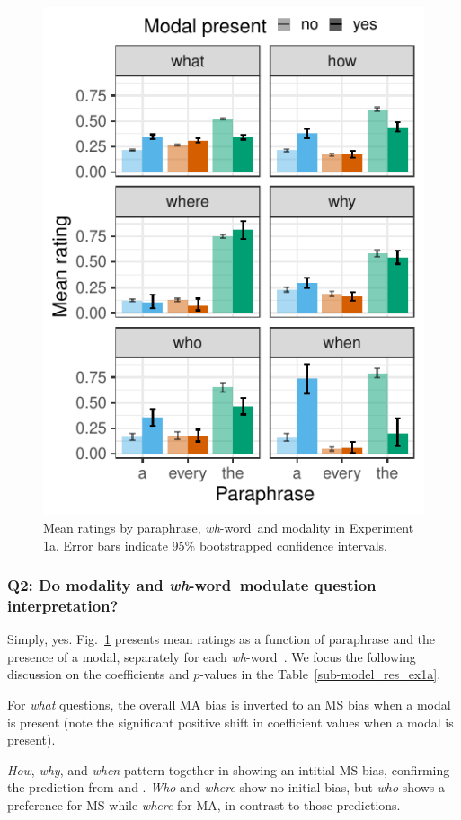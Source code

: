 \documentclass[12pt,letterpaper,table,svgnames,dvipsnames]{article}
\newcommand{\tableref}[1]{Table~\ref{#1}}
\newcommand{\figref}[1]{Fig.~\ref{#1}}
\newcommand{\whw}{\emph{wh}-word~}
\begin{document}
\begin{figure}[h!]
\centering
\includegraphics[scale=1]{figures/modxwh_rq_context.pdf}
\caption{Mean ratings by paraphrase, \whw and modality in Experiment 1a. Error bars indicate 95\% bootstrapped confidence intervals.} 
\label{ex1a_modXwh}
\end{figure}


\subsubsection{Q2: Do modality and \whw modulate question interpretation?}
Simply, yes. \figref{ex1a_modXwh} presents mean ratings as a function of paraphrase and the presence of a modal, separately for each \whw. We focus the following discussion on the coefficients and $p$-values in the \tableref{sub-model_res_ex1a}.

For \emph{what} questions, the overall MA bias is inverted to an MS bias when a modal is present (note the significant positive shift in coefficient values when a modal is present).

\emph{How}, \emph{why}, and \emph{when} pattern together in showing an intitial MS bias, confirming the prediction from  and . \emph{Who} and \emph{where} show no initial bias, but \emph{who} shows a preference for MS while \emph{where} for MA, in contrast to those predictions. 
\end{document}
